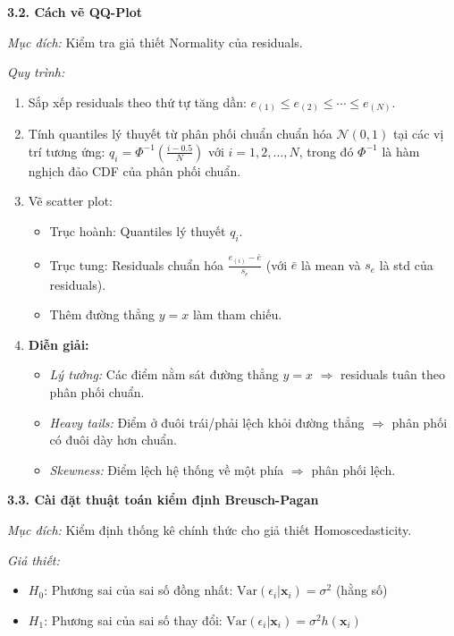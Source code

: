 \textbf{3.2. Cách vẽ QQ-Plot}

\textit{Mục đích:} Kiểm tra giả thiết Normality của residuals.

\textit{Quy trình:}
\begin{enumerate}
    \item Sắp xếp residuals theo thứ tự tăng dần: $e_{(1)} \leq e_{(2)} \leq \cdots \leq e_{(N)}$.
    
    \item Tính quantiles lý thuyết từ phân phối chuẩn chuẩn hóa $\mathcal{N}(0, 1)$ tại các vị trí tương ứng: $q_i = \Phi^{-1}\left(\frac{i - 0.5}{N}\right)$ với $i = 1, 2, \ldots, N$, trong đó $\Phi^{-1}$ là hàm nghịch đảo CDF của phân phối chuẩn.
    
    \item Vẽ scatter plot:
    \begin{itemize}
        \item Trục hoành: Quantiles lý thuyết $q_i$.
        \item Trục tung: Residuals chuẩn hóa $\frac{e_{(i)} - \bar{e}}{s_e}$ (với $\bar{e}$ là mean và $s_e$ là std của residuals).
        \item Thêm đường thẳng $y = x$ làm tham chiếu.
    \end{itemize}
    
    \item \textbf{Diễn giải:}
    \begin{itemize}
        \item \textit{Lý tưởng:} Các điểm nằm sát đường thẳng $y = x$ $\Rightarrow$ residuals tuân theo phân phối chuẩn.
        \item \textit{Heavy tails:} Điểm ở đuôi trái/phải lệch khỏi đường thẳng $\Rightarrow$ phân phối có đuôi dày hơn chuẩn.
        \item \textit{Skewness:} Điểm lệch hệ thống về một phía $\Rightarrow$ phân phối lệch.
    \end{itemize}
\end{enumerate}

\textbf{3.3. Cài đặt thuật toán kiểm định Breusch-Pagan}

\textit{Mục đích:} Kiểm định thống kê chính thức cho giả thiết Homoscedasticity.

\textit{Giả thiết:}
\begin{itemize}
    \item $H_0$: Phương sai của sai số đồng nhất: $\text{Var}(\epsilon_i | \mathbf{x}_i) = \sigma^2$ (hằng số)
    \item $H_1$: Phương sai của sai số thay đổi: $\text{Var}(\epsilon_i | \mathbf{x}_i) = \sigma^2 h(\mathbf{x}_i)$
\end{itemize}

